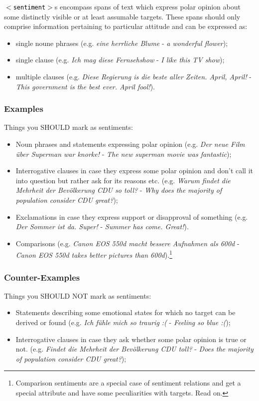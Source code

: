 \documentclass[11pt,a4paper]{article}
\newcommand{\xmltag}[1]{\textcolor{black}{{\small$<$#1$>$}}}
\begin{document}
\texttt{\xmltag{sentiment}}s encompass spans of text which express
polar opinion about some distinctly visible or at least assumable
targets. These spans should only comprise information pertaining to
particular attitude and can be expressed as:
\begin{itemize}
  \item single noune phrases (e.g. \textit{eine herrliche Blume} -
    \textit{a wonderful flower});
  \item single clause (e.g. \textit{Ich mag diese Fernsehshow} -
    \textit{I like this TV show});
  \item multiple clauses (e.g. \textit{Diese Regierung is die beste
    aller Zeiten. April, April!} - \textit{This government is the best
    ever. April fool!}).
\end{itemize}

\subsubsection{Examples}
Things you SHOULD mark as sentiments:
\begin{itemize}
  \item Noun phrases and statements expressing polar opinion
    (e.g. \textit{Der neue Film \"uber Superman war knorke!} -
    \textit{The new superman movie was fantastic});
  \item Interrogative clauses in case they express some polar opinion
    and don't call it into question but rather ask for its reasons
    etc. (e.g. \textit{Warum findet die Mehrheit der Bev\"olkerung CDU
      so toll?} - \textit{Why does the majority of population consider
      CDU great?});
  \item Exclamations in case they express support or disapproval of
    something (e.g. \textit{Der Sommer ist da. Super!} -
    \textit{Summer has come. Great!}).
  \item Comparisons (e.g. \textit{Canon EOS 550d macht bessere
    Aufnahmen als 600d} - \textit{Canon EOS 550d takes better pictures
    than 600d}).\footnote{Comparison sentiments are a special case of
    sentiment relations and get a special attribute and have some
    peculiarities with targets. Read on.}

\end{itemize}

\subsubsection{Counter-Examples}
Things you SHOULD NOT mark as sentiments:
\begin{itemize}
  \item Statements describing some emotional states for which no
    target can be derived or found (e.g. \textit{Ich f\"uhle mich so
      traurig :(} - \textit{Feeling so blue :(});
  \item Interrogative clauses in case they ask whether some polar
    opinion is true or not. (e.g. \textit{Findet die Mehrheit
      der Bev\"olkerung CDU toll?} - \textit{Does the majority
      of population consider CDU great?});
\end{itemize}
\end{document}
